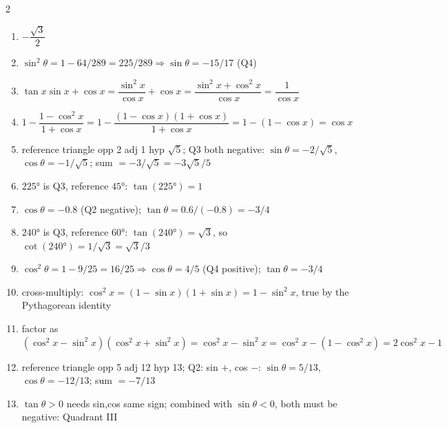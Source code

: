 \documentclass[11pt]{article}
\begin{document}
\begin{keybox}
\begin{multicols}{2}
\small
\begin{enumerate}[leftmargin=*,itemsep=3pt]
  \item $-\dfrac{\sqrt3}{2}$
  \item $\sin^2\theta=1-64/289=225/289\Rightarrow\sin\theta=-15/17$ (Q4)
  \item $\tan x\sin x+\cos x=\dfrac{\sin^2x}{\cos x}+\cos x=\dfrac{\sin^2x+\cos^2x}{\cos x}=\dfrac{1}{\cos x}$
  \item $1-\dfrac{1-\cos^2x}{1+\cos x}=1-\dfrac{(1-\cos x)(1+\cos x)}{1+\cos x}=1-(1-\cos x)=\cos x$
  \item reference triangle opp 2 adj 1 hyp $\sqrt5$; Q3 both negative: $\sin\theta=-2/\sqrt5$, $\cos\theta=-1/\sqrt5$; sum $=-3/\sqrt5=-3\sqrt5/5$
  \item $225°$ is Q3, reference $45°$: $\tan(225°)=1$
  \item $\cos\theta=-0.8$ (Q2 negative); $\tan\theta=0.6/(-0.8)=-3/4$
  \item $240°$ is Q3, reference $60°$: $\tan(240°)=\sqrt3$, so $\cot(240°)=1/\sqrt3=\sqrt3/3$
  \item $\cos^2\theta=1-9/25=16/25\Rightarrow\cos\theta=4/5$ (Q4 positive); $\tan\theta=-3/4$
  \item cross-multiply: $\cos^2x=(1-\sin x)(1+\sin x)=1-\sin^2x$, true by the Pythagorean identity
  \item factor as $(\cos^2x-\sin^2x)(\cos^2x+\sin^2x)=\cos^2x-\sin^2x=\cos^2x-(1-\cos^2x)=2\cos^2x-1$
  \item reference triangle opp 5 adj 12 hyp 13; Q2: sin $+$, cos $-$: $\sin\theta=5/13$, $\cos\theta=-12/13$; sum $=-7/13$
  \item $\tan\theta>0$ needs sin,cos same sign; combined with $\sin\theta<0$, both must be negative: Quadrant III
\end{enumerate}
\end{multicols}
\end{keybox}
\end{document}
